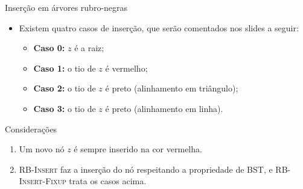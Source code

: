 \documentclass[aspectratio=169,10pt]{beamer}
\newcommand{\proc}[1]{\textnormal{\rmfamily\textsc{#1}}}
\begin{document}
\begin{frame}{Inserção em árvores rubro-negras}
  \begin{itemize}
    \item Existem quatro casos de inserção, que serão comentados nos slides a seguir:
      \begin{itemize}
        \item \textbf{Caso 0:} $z$ é a raiz;
        \item \textbf{Caso 1:} o tio de $z$ é vermelho;
        \item \textbf{Caso 2:} o tio de $z$ é preto (alinhamento em \alert{triângulo});
        \item \textbf{Caso 3:} o tio de $z$ é preto (alinhamento em \alert{linha}).
      \end{itemize}
  \end{itemize}

  \vspace{4mm}
  \begin{block}{Considerações}
    \begin{enumerate}
      \item Um novo nó $z$ é sempre inserido na cor \alert{vermelha}.
      \item \proc{RB-Insert} faz a inserção do nó respeitando a propriedade de BST, e
            \proc{RB-Insert-Fixup} trata os casos acima.
    \end{enumerate}
  \end{block}
\end{frame}
\end{document}
